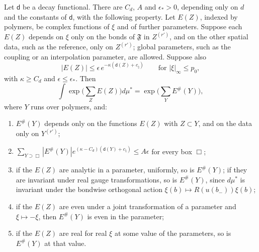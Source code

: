 \begin{theorem}\label{thm:mayer}
Let $\mathsf d$ be a decay functional. There are $C_d$, $A$ and $\epsilon_*>0$, depending only on $d$ and the constants of $\mathsf d$, with the following property. Let $E(Z)$, indexed by polymers, be complex functions of $\xi$ and of further parameters. Suppose each $E(Z)$ depends on $\xi$ only on the bonds of $\mathfrak F$ in $Z^{(r')}$, and on the other spatial data, such as the reference, only on $Z^{(r')}$; global parameters, such as the coupling or an interpolation parameter, are allowed. Suppose also
\[
|E(Z)|\le\epsilon\,e^{-\kappa(\mathsf d(Z)+c_\natural)}\qquad\text{for }|\xi|_\infty\le p_0,
\]
with $\kappa\ge C_d$ and $\epsilon\le\epsilon_*$. Then
\[
\int\exp\Big(\sum_ZE(Z)\Big)d\mu^*=\exp\Big(\sum_YE^\#(Y)\Big),
\]
where $Y$ runs over polymers, and:
\begin{enumerate}[label=(\alph*)]
\item $E^\#(Y)$ depends only on the functions $E(Z)$ with $Z\subset Y$, and on the data only on $Y^{(r')}$;
\item $\sum_{Y\supset\Box}|E^\#(Y)|e^{(\kappa-C_d)(\mathsf d(Y)+c_\natural)}\le A\epsilon$ for every box $\Box$;
\item if the $E(Z)$ are analytic in a parameter, uniformly, so is $E^\#(Y)$; if they are invariant under real gauge transformations, so is $E^\#(Y)$, since $d\mu^*$ is invariant under the bondwise orthogonal action $\xi(b)\mapsto R(u(b_-))\xi(b)$;
\item if the $E(Z)$ are even under a joint transformation of a parameter and $\xi\mapsto-\xi$, then $E^\#(Y)$ is even in the parameter;
\item if the $E(Z)$ are real for real $\xi$ at some value of the parameters, so is $E^\#(Y)$ at that value.
\end{enumerate}
\end{theorem}

